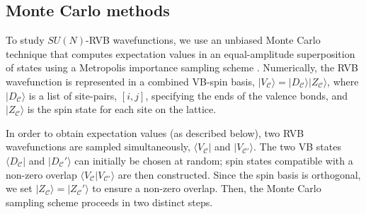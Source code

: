 \documentclass[11pt]{iopart}
\begin{document}
\subsection{Monte Carlo methods}
\label{sec:numerics}


To study $SU(N)$-RVB wavefunctions, we use an unbiased Monte Carlo technique that computes expectation values in an equal-amplitude superposition of states using a Metropolis importance sampling scheme \cite{RVB2}.  Numerically, the RVB wavefunction is represented in a combined VB-spin basis, $|V_{\mathcal C} \rangle = |D_{\mathcal C} \rangle |Z_{\mathcal C} \rangle$, where $| D_{\mathcal C} \rangle$ is a list of site-pairs, $[i,j]$, specifying the ends of the valence bonds, and $|Z_{\mathcal C} \rangle$ is the spin state for each site on the lattice.

In order to obtain expectation values (as described below), two RVB wavefunctions are sampled simultaneously, $\langle V_{\mathcal C} |$ and $| V_{\mathcal C'} \rangle$.  The two VB states $\langle D_{\mathcal C} |$ and $| D_{\mathcal C}' \rangle$ can initially be chosen at random; spin states compatible with a non-zero overlap $\langle V_{\mathcal C} | V_{\mathcal C'} \rangle$ are then constructed.  Since the spin basis is orthogonal, we set $|Z_{\mathcal C} \rangle = | Z_{\mathcal C}' \rangle$ to ensure a non-zero overlap.  Then, the Monte Carlo sampling scheme proceeds in two distinct steps.   
\end{document}

